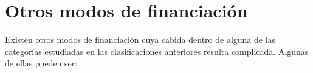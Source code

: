 \begin{figure}[htb]
  \centerline{}
  \label{IMG:Hecker}
\end{figure}

\section{Otros modos de financiación}

Existen otros modos de financiación cuya cabida dentro de alguna de las
categorías estudiadas en las clasificaciones anteriores resulta complicada.
Algunas de ellas pueden ser:

